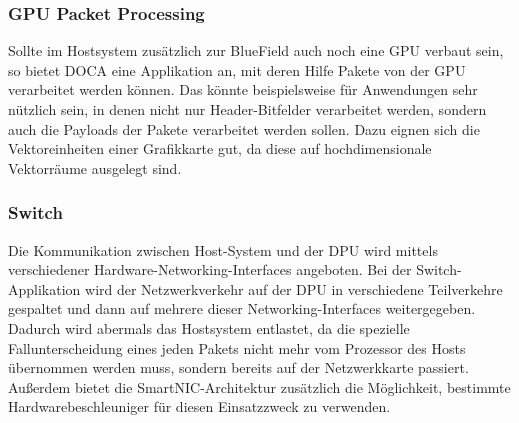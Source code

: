 \subsubsection{GPU Packet Processing}
Sollte im Hostsystem zusätzlich zur BlueField auch noch eine GPU verbaut sein, so bietet DOCA eine Applikation an, mit deren Hilfe Pakete von der GPU verarbeitet werden können. Das könnte beispielsweise für Anwendungen sehr nützlich sein, in denen nicht nur Header-Bitfelder verarbeitet werden, sondern auch die Payloads der Pakete verarbeitet werden sollen. Dazu eignen sich die Vektoreinheiten einer Grafikkarte gut, da diese auf hochdimensionale Vektorräume ausgelegt sind. 

\subsubsection{Switch}
Die Kommunikation zwischen Host-System und der DPU wird mittels verschiedener Hardware-Networking-Interfaces angeboten. Bei der Switch-Applikation wird der Netzwerkverkehr auf der DPU in verschiedene Teilverkehre gespaltet und dann auf mehrere dieser Networking-Interfaces weitergegeben. Dadurch wird abermals das Hostsystem entlastet, da die spezielle Fallunterscheidung eines jeden Pakets nicht mehr vom Prozessor des Hosts übernommen werden muss, sondern bereits auf der Netzwerkkarte passiert. Außerdem bietet die SmartNIC-Architektur zusätzlich die Möglichkeit, bestimmte Hardwarebeschleuniger für diesen Einsatzzweck zu verwenden.